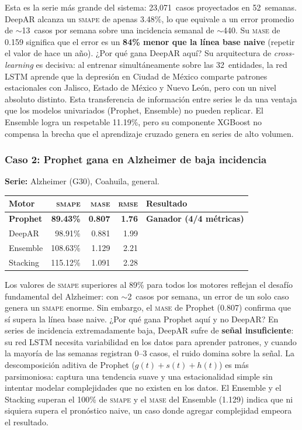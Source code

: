 \documentclass[12pt, letterpaper]{article}
\newcommand{\smape}{\textnormal{\textsc{smape}}}
\newcommand{\mase}{\textnormal{\textsc{mase}}}
\newcommand{\rmse}{\textnormal{\textsc{rmse}}}
\begin{document}
Esta es la serie más grande del sistema: 23,071~casos proyectados en 52~semanas. DeepAR alcanza un \smape{} de apenas 3.48\%, lo que equivale a un error promedio de $\sim$13~casos por semana sobre una incidencia semanal de $\sim$440. Su \mase{} de 0.159 significa que el error es un \textbf{84\% menor que la línea base naive} (repetir el valor de hace un año). ¿Por qué gana DeepAR aquí? Su arquitectura de \textit{cross-learning} es decisiva: al entrenar simultáneamente sobre las 32~entidades, la red LSTM aprende que la depresión en Ciudad de México comparte patrones estacionales con Jalisco, Estado de México y Nuevo León, pero con un nivel absoluto distinto. Esta transferencia de información entre series le da una ventaja que los modelos univariados (Prophet, Ensemble) no pueden replicar. El Ensemble logra un respetable 11.19\%, pero su componente XGBoost no compensa la brecha que el aprendizaje cruzado genera en series de alto volumen.

\newpage

\subsubsection{Caso 2: Prophet gana en Alzheimer de baja incidencia}

\textbf{Serie:} Alzheimer (G30), Coahuila, general.

\begin{table}[H]
\centering
\small
\begin{tabularx}{\textwidth}{X r r r l}
\toprule
\textbf{Motor} & \textbf{\smape{}} & \textbf{\mase{}} & \textbf{\rmse{}} & \textbf{Resultado} \\
\midrule
\rowcolor{lightgreen} \textbf{Prophet} & \textbf{89.43\%} & \textbf{0.807} & \textbf{1.76} & \textbf{Ganador (4/4 métricas)} \\
DeepAR & 98.91\% & 0.881 & 1.99 & \\
Ensemble & 108.63\% & 1.129 & 2.21 & \\
Stacking & 115.12\% & 1.091 & 2.28 & \\
\bottomrule
\end{tabularx}
\end{table}

Los valores de \smape{} superiores al 89\% para todos los motores reflejan el desafío fundamental del Alzheimer: con $\sim$2~casos por semana, un error de un solo caso genera un \smape{} enorme. Sin embargo, el \mase{} de Prophet (0.807) confirma que sí supera la línea base naive. ¿Por qué gana Prophet aquí y no DeepAR? En series de incidencia extremadamente baja, DeepAR sufre de \textbf{señal insuficiente}: su red LSTM necesita variabilidad en los datos para aprender patrones, y cuando la mayoría de las semanas registran 0--3 casos, el ruido domina sobre la señal. La descomposición aditiva de Prophet ($g(t) + s(t) + h(t)$) es más parsimoniosa: captura una tendencia suave y una estacionalidad simple sin intentar modelar complejidades que no existen en los datos. El Ensemble y el Stacking superan el 100\% de \smape{} y el \mase{} del Ensemble (1.129) indica que ni siquiera supera el pronóstico naive, un caso donde agregar complejidad empeora el resultado.
\end{document}

